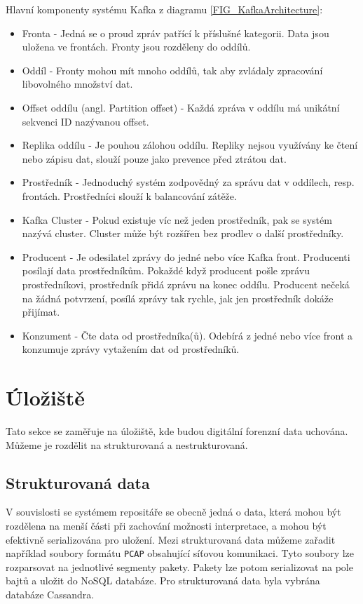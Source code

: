 \vspace{0.5cm}
\noindent Hlavní komponenty systému Kafka z diagramu \ref{FIG_KafkaArchitecture}:
\begin{itemize}
    \item Fronta - Jedná se o proud zpráv patřící k příslušné kategorii. Data jsou uložena ve frontách. Fronty jsou rozděleny do oddílů.
    
    \item Oddíl - Fronty mohou mít mnoho oddílů, tak aby zvládaly zpracování libovolného množství dat.

    \item Offset oddílu (angl. Partition offset) - Každá zpráva v oddílu má unikátní sekvenci ID nazývanou offset.

    \item Replika oddílu - Je pouhou zálohou oddílu. Repliky nejsou využívány ke čtení nebo zápisu dat, slouží pouze jako prevence před ztrátou dat.
    
    \item Prostředník - Jednoduchý systém zodpovědný za správu dat v oddílech, resp. frontách. Prostředníci slouží k balancování zátěže.
    
    \item Kafka Cluster - Pokud existuje víc než jeden prostředník, pak se systém nazývá cluster. Cluster může být rozšířen bez prodlev o další prostředníky.
    
    \item Producent - Je odesilatel zprávy do jedné nebo více Kafka front. Producenti posílají data prostředníkům. Pokaždé když producent pošle zprávu prostředníkovi, prostředník přidá zprávu na konec oddílu. Producent nečeká na žádná potvrzení, posílá zprávy tak rychle, jak jen prostředník dokáže přijímat.
    
    \item Konzument - Čte data od prostředníka(ů). Odebírá z jedné nebo více front a konzumuje zprávy vytažením dat od prostředníků.
\end{itemize}

\section{Úložiště}
Tato sekce se zaměřuje na úložiště, kde budou digitální forenzní data uchována. Můžeme je rozdělit na strukturovaná a nestrukturovaná.

\subsection{Strukturovaná data}
V souvislosti se systémem repositáře se obecně jedná o data, která mohou být rozdělena na menší části při zachování možnosti interpretace, a mohou být efektivně serializována pro uložení. Mezi strukturovaná data můžeme zařadit například soubory formátu \texttt{PCAP} obsahující síťovou komunikaci. Tyto soubory lze rozparsovat na jednotlivé segmenty pakety. Pakety lze potom serializovat na pole bajtů a uložit do NoSQL databáze. Pro strukturovaná data byla vybrána databáze Cassandra.

